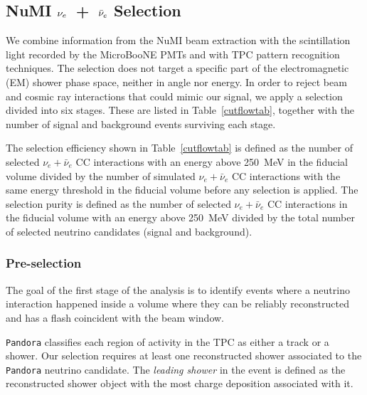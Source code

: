  \subsection{NuMI $\nu_{\lowercase{e}}$~+~$\bar{\nu}_{\lowercase{e}}$ Selection}\label{numi_nue_selection}

We combine information from the NuMI beam extraction with the scintillation light recorded by the MicroBooNE PMTs and with TPC pattern recognition techniques. The selection does not target a specific part of the electromagnetic (EM) shower phase space, neither in angle nor energy. In order to reject beam and cosmic ray interactions that could mimic our signal, we apply a selection divided into six stages. These are listed in Table~\ref{cutflowtab}, together with the number of signal and background events surviving each stage.




The selection efficiency shown in Table~\ref{cutflowtab} is defined as the number of selected $\nu_e + \bar{\nu}_e$ CC interactions with an energy above 250~MeV in the fiducial volume divided by the number of simulated $\nu_e + \bar{\nu}_e$ CC interactions with the same energy threshold in the fiducial volume before any selection is applied. The selection purity is defined as the number of selected $\nu_e + \bar{\nu}_e$ CC interactions in the fiducial volume with an energy above 250~MeV divided by the total number of selected neutrino candidates (signal and background). 


\subsubsection{Pre-selection}\label{section_fv_cut}

The goal of the first stage of the analysis is to identify events where a neutrino interaction happened inside a volume where they can be reliably reconstructed and has a flash coincident with the beam window. 

\texttt{Pandora} classifies each region of activity in the TPC as either a track or a shower. Our selection requires at least one reconstructed shower associated to the \texttt{Pandora} neutrino candidate. The \textit{leading shower} in the event is defined as the reconstructed shower object with the most charge deposition associated with it.

